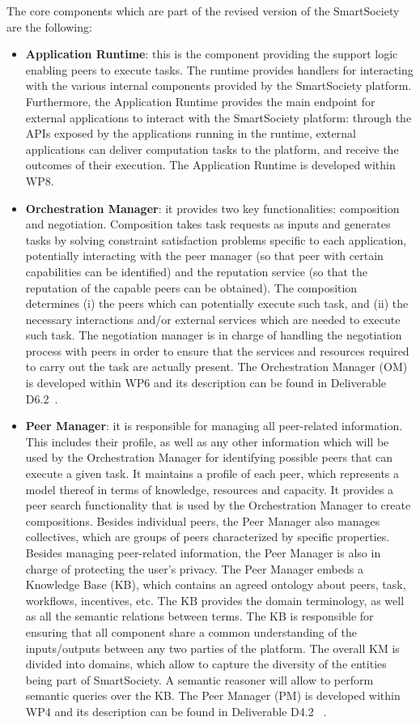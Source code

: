 The core components which are part of the revised version of the SmartSociety are the following:
\begin{itemize}
\item \textbf{Application Runtime}: this is the component providing the support logic enabling peers to execute tasks. The runtime provides handlers for interacting with the various internal components provided by the SmartSociety platform. Furthermore, the Application Runtime provides the main endpoint for external applications to interact with the SmartSociety platform: through the APIs exposed by the applications running in the runtime, external applications can deliver computation tasks to the platform, and receive the  outcomes of their execution. The Application Runtime is developed within WP8. 

\item \textbf{Orchestration Manager}: it provides two key functionalities: composition and negotiation. Composition takes task requests as inputs and generates tasks by solving constraint satisfaction problems specific to each application, potentially interacting with the peer manager (so that peer with certain capabilities can be identified) and the reputation service (so that the reputation of the capable peers can be obtained). The composition determines (i) the peers which can potentially execute such task, and (ii) the necessary interactions and/or external services which are needed to execute such task.  The negotiation manager is in charge of handling the negotiation process with peers in order to ensure that the services and resources required to carry out the task are actually present. The Orchestration Manager (OM) is developed within WP6 and its description can be found in  Deliverable D6.2~\cite{D6.2}.

\item \textbf{Peer Manager}: it is responsible for managing all peer-related information. This includes their profile, as well as any other information which will be used by the Orchestration Manager for identifying possible peers that can execute a given task.  It maintains a profile of each peer, which
represents a model thereof in terms of knowledge, resources and
capacity. It provides a peer search functionality that is used by the Orchestration Manager to create compositions. Besides individual peers, the Peer Manager also manages collectives, which are groups of peers characterized by specific properties. Besides managing peer-related information, the Peer Manager is also in charge of protecting the user's privacy. The Peer Manager embeds a Knowledge Base (KB), which contains an agreed ontology about peers, task, workflows, incentives, etc. The KB provides the domain terminology, as well as all the semantic relations between terms. The KB is responsible for ensuring that all component share a common understanding of the inputs/outputs between any two parties of the platform. The overall KM is divided into domains, which allow to capture the diversity of the entities being part of SmartSociety. A semantic reasoner will allow to perform semantic queries over the KB. The Peer Manager (PM) is developed within WP4 and its description can be found in Deliverable D4.2~\cite{D4.2} .


\end{itemize}
